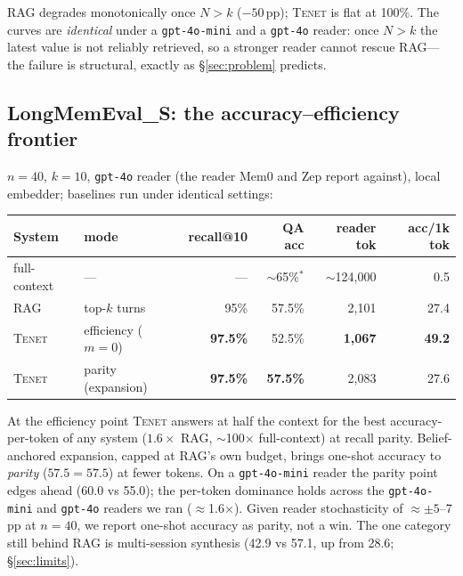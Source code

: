 \documentclass[11pt]{article}
\newcommand{\tenet}{\textsc{Tenet}}
\begin{document}
RAG degrades monotonically once $N>k$ ($-50$\,pp); \tenet{} is flat at 100\%. The curves
are \emph{identical} under a \texttt{gpt-4o-mini} and a \texttt{gpt-4o} reader: once
$N>k$ the latest value is not reliably retrieved, so a stronger reader cannot rescue
RAG---the failure is structural, exactly as \S\ref{sec:problem} predicts.

\subsection{LongMemEval\_S: the accuracy--efficiency frontier}
$n{=}40$, $k{=}10$, \texttt{gpt-4o} reader (the reader Mem0 and Zep report against),
local embedder; baselines run under identical settings:

\begin{center}
\begin{tabular}{llrrrr}
\toprule
System & mode & recall@10 & QA acc & reader tok & acc/1k tok\\
\midrule
full-context & --- & --- & $\sim$65\%$^{*}$ & $\sim$124{,}000 & 0.5\\
RAG & top-$k$ turns & 95\% & 57.5\% & 2{,}101 & 27.4\\
\tenet{} & efficiency ($m{=}0$) & \textbf{97.5\%} & 52.5\% & \textbf{1{,}067} & \textbf{49.2}\\
\tenet{} & parity (expansion) & \textbf{97.5\%} & \textbf{57.5\%} & 2{,}083 & 27.6\\
\bottomrule
\end{tabular}
\end{center}

At the efficiency point \tenet{} answers at half the context for the best
accuracy-per-token of any system ($1.6\times$ RAG, $\sim$100$\times$ full-context) at
recall parity. Belief-anchored expansion, capped at RAG's own budget, brings one-shot
accuracy to \emph{parity} ($57.5=57.5$) at fewer tokens. On a \texttt{gpt-4o-mini} reader
the parity point edges ahead (60.0 vs 55.0); the per-token dominance holds across
the \texttt{gpt-4o-mini} and \texttt{gpt-4o} readers we ran
($\approx$1.6$\times$). Given reader stochasticity of $\approx\pm5$--7\,pp at
$n{=}40$, we report one-shot accuracy as parity, not a win. The one category still behind
RAG is multi-session synthesis (42.9 vs 57.1, up from 28.6; \S\ref{sec:limits}).
\end{document}

